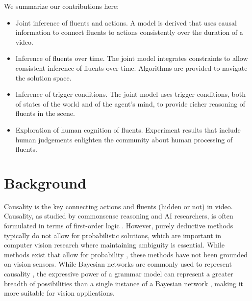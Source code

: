 \documentclass[10pt,journal,letterpaper,compsoc]{IEEEtran}
\begin{document}


  We summarize our contributions here:
\begin{itemize}
\item Joint inference of fluents and actions.  A model is derived that uses causal information to connect fluents to actions consistently over the duration of a video.  
\item Inference of fluents over time.  The joint model integrates constraints to allow consistent inference of fluents over time.  Algorithms are provided to navigate the solution space.
\item Inference of trigger conditions.  The joint model uses trigger conditions, both of states of the world and of the agent's mind, to provide richer reasoning of fluents in the scene.  %
\item Exploration of human cognition of fluents.  Experiment results that include human judgements enlighten the community about human processing of fluents.  %
\end{itemize}


\section{Background}

Causality is the key connecting actions and fluents (hidden or not) in video.  Causality, as studied by commonsense reasoning and AI researchers, is often formulated in terms of first-order logic \cite{CommonsenseReasoning}.  However, purely deductive methods typically do not allow for probabilistic solutions, which are important in computer vision research where maintaining ambiguity is essential.  While methods exist that allow for probability \cite{MarkovLogicNetwork, PearlCausality}, these methods have not been grounded on vision sensors.  While Bayesian networks are commonly used to represent causality \cite{PearlCausality}, the expressive power of a grammar model can represent a greater breadth of possibilities than a single instance of a Bayesian network \cite{TenenbaumCausalGrammar}, making it more suitable for vision applications.
\end{document}
